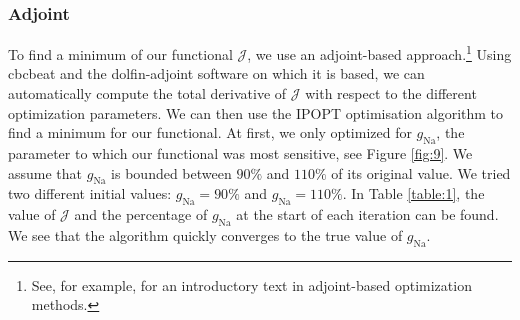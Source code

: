 \documentclass{article}
\begin{document}
\subsubsection{Adjoint} \label{Adjoint}
To find a minimum of our functional $\mathcal{J}$, we use an adjoint-based approach.\footnote{See, for example, \cite{Gunzburger} for an introductory text in adjoint-based optimization methods.} Using cbcbeat and the dolfin-adjoint software on which it is based, we can automatically compute the total derivative of $\mathcal{J}$ with respect to the different optimization parameters. 
We can then use the IPOPT optimisation algorithm \cite{Wachter2006} to find a minimum for our functional. At first, we only optimized for $g_{\mathrm{Na}}$, the parameter to which our functional was most sensitive, see Figure \ref{fig:9}. We assume that  $g_{\mathrm{Na}}$ is bounded between $90\%$ and $110\%$ of its original value. We tried two different initial values: $g_{\mathrm{Na}}=90\%$ and $g_{\mathrm{Na}}=110\%$. In Table \ref{table:1}, the value of $\mathcal{J}$ and the percentage of $g_{\mathrm{Na}}$ at the start of each iteration can be found. We see that the algorithm quickly converges to the true value of $g_{\mathrm{Na}}$. 
\end{document}
